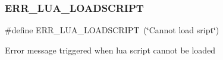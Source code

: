\subsubsection{\texorpdfstring{E\+R\+R\+\_\+\+L\+U\+A\+\_\+\+L\+O\+A\+D\+S\+C\+R\+I\+PT}{ERR\_LUA\_LOADSCRIPT}}
{\footnotesize\ttfamily \#define E\+R\+R\+\_\+\+L\+U\+A\+\_\+\+L\+O\+A\+D\+S\+C\+R\+I\+PT~(\char`\"{}Cannot load sript\char`\"{})}

Error message triggered when lua script cannot be loaded 